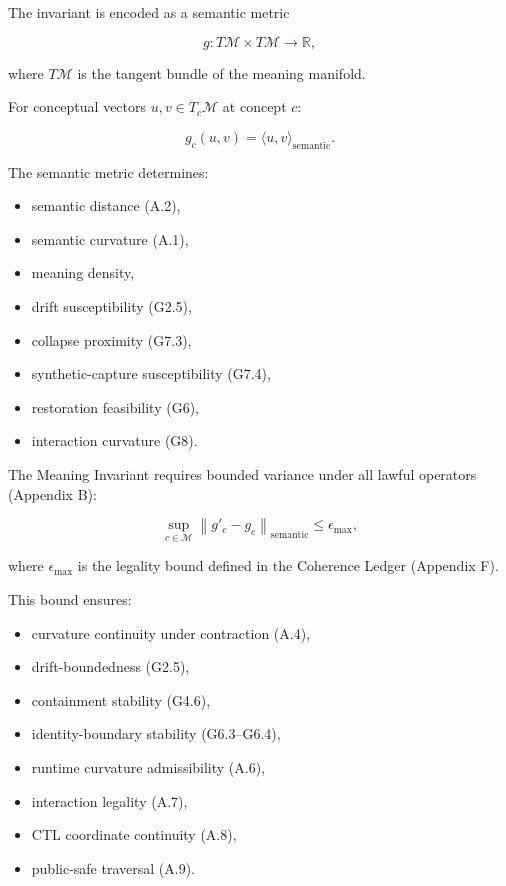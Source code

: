 \medskip

\noindent The invariant is encoded as a semantic metric


\[
g : T\mathcal{M} \times T\mathcal{M} \rightarrow \mathbb{R},
\]


where $T\mathcal{M}$ is the tangent bundle of the meaning manifold.

For conceptual vectors $u, v \in T_c\mathcal{M}$ at concept $c$:


\[
g_c(u, v) = \langle u, v \rangle_{\mathrm{semantic}}.
\]



\medskip

\noindent The semantic metric determines:
\begin{itemize}
    \item semantic distance (A.2),
    \item semantic curvature (A.1),
    \item meaning density,
    \item drift susceptibility (G2.5),
    \item collapse proximity (G7.3),
    \item synthetic-capture susceptibility (G7.4),
    \item restoration feasibility (G6),
    \item interaction curvature (G8).
\end{itemize}

\medskip

\noindent The Meaning Invariant requires bounded variance under all lawful
operators (Appendix B):


\[
\sup_{c \in \mathcal{M}}
\left\| g'_c - g_c \right\|_{\mathrm{semantic}}
\le \epsilon_{\max},
\]


where $\epsilon_{\max}$ is the legality bound defined in the Coherence Ledger
(Appendix F).

\medskip

\noindent This bound ensures:
\begin{itemize}
    \item curvature continuity under contraction (A.4),
    \item drift-boundedness (G2.5),
    \item containment stability (G4.6),
    \item identity-boundary stability (G6.3--G6.4),
    \item runtime curvature admissibility (A.6),
    \item interaction legality (A.7),
    \item CTL coordinate continuity (A.8),
    \item public-safe traversal (A.9).
\end{itemize}

